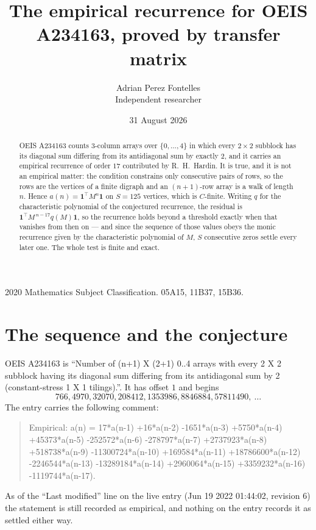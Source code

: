 \documentclass[11pt,a4paper]{article}
\title{The empirical recurrence for OEIS A234163, proved by transfer matrix}
\author{Adrian Perez Fontelles\\ \small Independent researcher}
\date{31 August 2026}
\theoremstyle{plain}
\theoremstyle{definition}
\begin{document}
\maketitle

\begin{abstract}
OEIS A234163 counts $3$-column arrays over $\{0,\dots,4\}$ in which every
$2\times2$ subblock has its diagonal sum differing from its antidiagonal sum by
exactly $2$, and it
carries an empirical recurrence of order $17$ contributed by R.~H.~Hardin. It is true,
and it is not an empirical matter: the condition constrains only consecutive pairs of rows,
so the rows are the vertices of a finite digraph and an $(n+1)$-row array is a walk of
length $n$. Hence $a(n)=\mathbf{1}^{\!\top}M^{n}\mathbf{1}$ on $S=125$ vertices, which
is $C$-finite. Writing $q$ for the characteristic polynomial of the conjectured recurrence,
the residual is $\mathbf{1}^{\!\top}M^{\,n-17}q(M)\mathbf{1}$, so the recurrence
holds beyond a threshold exactly when that vanishes from then on --- and since the sequence
of those values obeys the monic recurrence given by the characteristic polynomial of $M$,
$S$ consecutive zeros settle every later one. The whole test is finite and exact.
\end{abstract}

\noindent\small 2020 Mathematics Subject Classification. 05A15, 11B37, 15B36.\normalsize

\section{The sequence and the conjecture}

OEIS A234163 is ``Number of (n+1) X (2+1) 0..4 arrays with every 2 X 2 subblock having its diagonal sum differing from its antidiagonal sum by 2 (constant-stress 1 X 1 tilings).''. It has offset
$1$ and begins
\[
766, 4970, 32070, 208412, 1353986, 8846884, 57811490,\ \dots
\]
The entry carries the following comment:
\begin{quote}\small
Empirical: a(n) = 17*a(n-1) +16*a(n-2) -1651*a(n-3) +5750*a(n-4) +45373*a(n-5) -252572*a(n-6) -278797*a(n-7) +2737923*a(n-8) +518738*a(n-9) -11300724*a(n-10) +169584*a(n-11) +18786600*a(n-12) -2246544*a(n-13) -13289184*a(n-14) +2960064*a(n-15) +3359232*a(n-16) -1119744*a(n-17).
\end{quote}
As of the ``Last modified'' line on the live entry (Jun 19 2022 01:44:02, revision 6) the statement is
still recorded as empirical, and nothing on the entry records it as settled either way.
\end{document}
